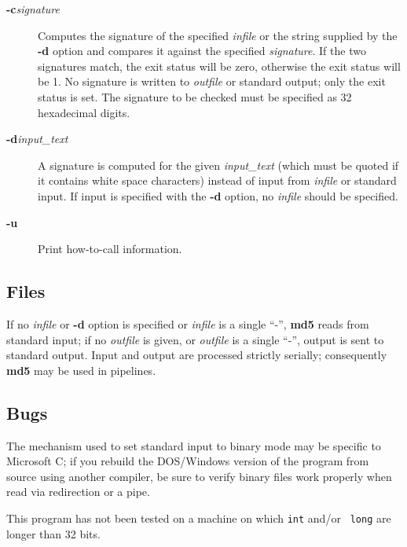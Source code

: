 \begin{description}

\item [{\bf -c}{\it signature}  ]
   Computes the signature of the specified {\it infile} or the string  supplied
by the {\bf -d} option and compares it against the specified  {\it signature}.
If the two signatures match, the exit status will be zero,  otherwise the exit
status will be 1. No signature is written to  {\it outfile} or standard
output; only the exit status is set. The  signature to be checked must be
specified as 32 hexadecimal digits.

\item [{\bf -d}{\it input\_text}  ]
   A signature is computed for the given {\it input\_text} (which must be  quoted
if it contains white space characters) instead of input from  {\it infile} or
standard input. If input is specified with the {\bf -d}  option, no {\it
infile} should be specified.

\item [{\bf -u}  ]
   Print how-to-call information.
   \end{description}

\subsection{Files}

If no {\it infile} or {\bf -d} option is specified or {\it infile} is a single
``-'', {\bf md5} reads from standard input; if no {\it outfile} is given, or
{\it outfile} is a single ``-'', output is sent to standard output. Input and
output are processed strictly serially; consequently {\bf md5} may be used in
pipelines.

\subsection{Bugs}

The mechanism used to set standard input to binary mode may be specific to
Microsoft C; if you rebuild the DOS/Windows version of the program from source
using another compiler, be sure to verify binary files work properly when read
via redirection or a pipe.

This program has not been tested on a machine on which {\tt int} and/or {\tt
long} are longer than 32 bits.

